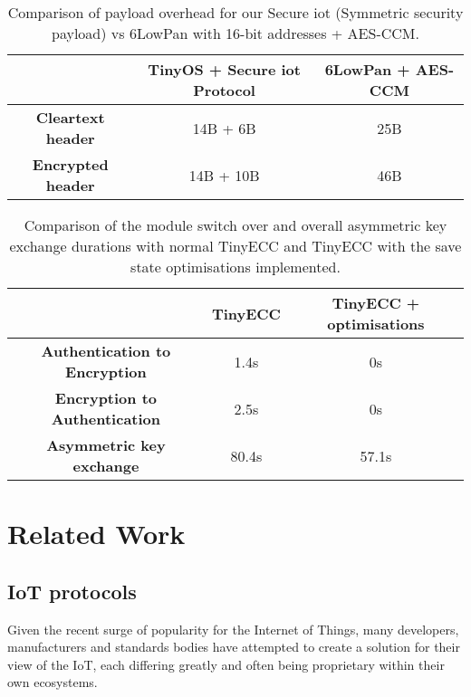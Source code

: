 \documentclass[conference]{./sty/IEEEtran}
\begin{document}
\begin{table}[h] %
  \begin{center} 
  \begin{tabular}{|c|c|c|} 
  \hline
                            & \textbf{TinyOS + Secure iot Protocol} & \textbf{6LowPan + AES-CCM} \\ \hline
  \textbf{Cleartext header} & 14B + 6B                              & 25B                        \\ \hline
  \textbf{Encrypted header} & 14B + 10B                             & 46B                        \\ \hline
  \end{tabular}
  \caption[Table]{Comparison of payload overhead for our Secure iot (Symmetric security payload) vs 6LowPan with 16-bit addresses + AES-CCM.}
  \label{tab:pdu_sizes}
  \end{center}
\end{table}
\vspace{-0.5cm}
\begin{table}[h] %
  \begin{center} 
  \begin{tabular}{|c|c|c|} 
  \hline
                                        & \textbf{TinyECC} & \textbf{TinyECC + optimisations} \\ \hline
  \textbf{Authentication to Encryption} & 1.4s             & 0s                      \\ \hline
  \textbf{Encryption to Authentication} & 2.5s             & 0s                      \\ \hline
  \textbf{Asymmetric key exchange}      & 80.4s            & 57.1s                     \\ \hline
  \end{tabular}
  \caption[Table]{Comparison of the module switch over and overall asymmetric key exchange durations with normal TinyECC and TinyECC with the save state optimisations implemented.}
  \label{tab:ECC_optimisations}
  \end{center}
\end{table}
\vspace{-0.5cm}

\section{Related Work} %
\label{sec:related_work}
\subsection{IoT protocols} %
\label{sub:iot_protocols}
Given the recent surge of popularity for the Internet of Things, many developers, manufacturers and standards bodies have attempted to create a solution for their view of the IoT, each differing greatly and often being proprietary within their own ecosystems. 
\end{document}
